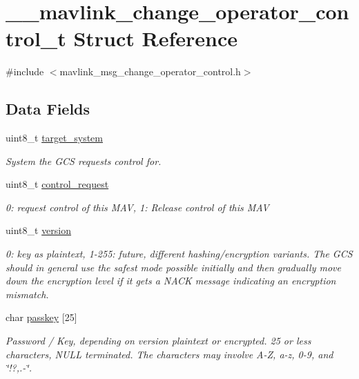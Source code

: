 \hypertarget{struct____mavlink__change__operator__control__t}{\section{\+\_\+\+\_\+mavlink\+\_\+change\+\_\+operator\+\_\+control\+\_\+t Struct Reference}
\label{struct____mavlink__change__operator__control__t}
}


{\ttfamily \#include $<$mavlink\+\_\+msg\+\_\+change\+\_\+operator\+\_\+control.\+h$>$}

\subsection*{Data Fields}
\begin{DoxyCompactItemize}
\item 
uint8\+\_\+t \hyperlink{struct____mavlink__change__operator__control__t_ac68f72fea3c066f00e0ccd0b978d119a}{target\+\_\+system}
\begin{DoxyCompactList}\small\item\em System the G\+C\+S requests control for. \end{DoxyCompactList}\item 
uint8\+\_\+t \hyperlink{struct____mavlink__change__operator__control__t_aef19fec531d51e7a3f57fe09a7f74c06}{control\+\_\+request}
\begin{DoxyCompactList}\small\item\em 0\+: request control of this M\+A\+V, 1\+: Release control of this M\+A\+V \end{DoxyCompactList}\item 
uint8\+\_\+t \hyperlink{struct____mavlink__change__operator__control__t_a033ed1de1f96ee19a64572952e29da39}{version}
\begin{DoxyCompactList}\small\item\em 0\+: key as plaintext, 1-\/255\+: future, different hashing/encryption variants. The G\+C\+S should in general use the safest mode possible initially and then gradually move down the encryption level if it gets a N\+A\+C\+K message indicating an encryption mismatch. \end{DoxyCompactList}\item 
char \hyperlink{struct____mavlink__change__operator__control__t_ad18d971feb4c5e1826c0f6fde0085ab0}{passkey} \mbox{[}25\mbox{]}
\begin{DoxyCompactList}\small\item\em Password / Key, depending on version plaintext or encrypted. 25 or less characters, N\+U\+L\+L terminated. The characters may involve A-\/\+Z, a-\/z, 0-\/9, and \char`\"{}!?,.-\/\char`\"{}. \end{DoxyCompactList}\end{DoxyCompactItemize}


